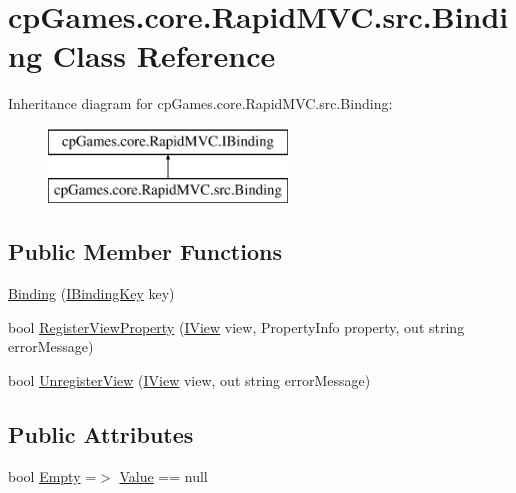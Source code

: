 \hypertarget{classcp_games_1_1core_1_1_rapid_m_v_c_1_1src_1_1_binding}{}\section{cp\+Games.\+core.\+Rapid\+M\+V\+C.\+src.\+Binding Class Reference}
\label{classcp_games_1_1core_1_1_rapid_m_v_c_1_1src_1_1_binding}
Inheritance diagram for cp\+Games.\+core.\+Rapid\+M\+V\+C.\+src.\+Binding\+:\begin{figure}[H]
\begin{center}
\leavevmode
\includegraphics[height=2.000000cm]{classcp_games_1_1core_1_1_rapid_m_v_c_1_1src_1_1_binding}
\end{center}
\end{figure}
\subsection*{Public Member Functions}
\begin{DoxyCompactItemize}
\item 
\mbox{\hyperlink{classcp_games_1_1core_1_1_rapid_m_v_c_1_1src_1_1_binding_a9226f1b3fcbdaf396822507557679556}{Binding}} (\mbox{\hyperlink{interfacecp_games_1_1core_1_1_rapid_m_v_c_1_1_i_binding_key}{I\+Binding\+Key}} key)
\item 
bool \mbox{\hyperlink{classcp_games_1_1core_1_1_rapid_m_v_c_1_1src_1_1_binding_aebd156eee7ea9bd0aea09c36b3a32a95}{Register\+View\+Property}} (\mbox{\hyperlink{interfacecp_games_1_1core_1_1_rapid_m_v_c_1_1_i_view}{I\+View}} view, Property\+Info property, out string error\+Message)
\item 
bool \mbox{\hyperlink{classcp_games_1_1core_1_1_rapid_m_v_c_1_1src_1_1_binding_a09b069af4432f3652799483a7dd41fee}{Unregister\+View}} (\mbox{\hyperlink{interfacecp_games_1_1core_1_1_rapid_m_v_c_1_1_i_view}{I\+View}} view, out string error\+Message)
\end{DoxyCompactItemize}
\subsection*{Public Attributes}
\begin{DoxyCompactItemize}
\item 
bool \mbox{\hyperlink{classcp_games_1_1core_1_1_rapid_m_v_c_1_1src_1_1_binding_a6fd3c1ee78b8433722e433cabdd9eba7}{Empty}} =$>$ \mbox{\hyperlink{classcp_games_1_1core_1_1_rapid_m_v_c_1_1src_1_1_binding_a7c9fdf154e45fdeb327d8fa112cf56e4}{Value}} == null
\end{DoxyCompactItemize}
